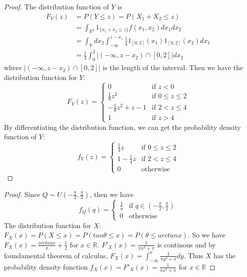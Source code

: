 \documentclass[10pt]{article}
\newenvironment{problem}[2][Problem]{\begin{trivlist}
\item[\hskip \labelsep {\bfseries #1}\hskip \labelsep {\bfseries #2.}]}{\end{trivlist}}
\begin{document}
\begin{problem}{1(b)}
\end{problem}
\begin{proof}
The distribution function of $Y$ is 
\begin{equation}
\begin{split}
F_{Y}(z) &= P(Y \le z)= P(X_{1}+X_{2} \le z)\\
&= \int_{\mathbb{R}^2} 1_{\{x_{1}+x_{2} \le z\}} f(x_{1}, x_{2})dx_{1}dx_{2}\\
&= \int_{\mathbb{R}}dx_{2}\int_{-\infty}^{z-x_{1}} \frac{1}{4} 1_{[0,2]}(x_{1}) 1_{[0,2]}(x_{2})dx_{1}\\
&= \frac{1}{4} \int_{0}^{2} \Big| (-\infty, z-x_{2}) \cap [0,2]\Big| dx_{2}
\end{split}
\end{equation}
where $\Big| (-\infty, z-x_{2}) \cap [0,2]\Big|$ is the length of the interval. Then we have the distribution function for $Y$:
\[F_{Y}(z)  = 
  \begin{cases}
  0 & \text{if $z < 0$} \\
  \frac{1}{8}z^2 & \text{if $0 \le z \le 2$} \\
  -\frac{1}{8}z^2 + z -1 & \text{if $2 < z \le 4$} \\
  1 & \text{if $z > 4$}
  \end{cases}
\]
By differentiating the distribution function, we can get the probability density function of $Y$:
\[f_{Y}(z)  = 
  \begin{cases}
  \frac{1}{4}z & \text{if $0 \le z \le 2$} \\
  1-\frac{1}{4}z & \text{if $2 < z \le 4$} \\
  0 & \text{otherwise}
  \end{cases}
\]
\end{proof}



\begin{problem}{2}
\end{problem}
 
\begin{proof}
Since $Q \sim U(-\frac{\pi}{2}, \frac{\pi}{2})$, then we have\\
\[f_{Q}(q) = 
  \begin{cases}
  \frac{1}{\pi} & \text{if $q \in (-\frac{\pi}{2}, \frac{\pi}{2})$} \\
  0 & \text{otherwise}
  \end{cases}
\]
The distribution function for $X$: $F_{X}(x) = P(X \le x) = P(tan\theta \le x) = P(\theta \le arctanx)$. So we have $F_{X}(x) =  \frac{arctanx}{\pi} + \frac{1}{2}$ for $x \in \mathbb{R}$. $F'_{X}(x) = \frac{1}{\pi x^2+\pi}$ is continous and by foundamental theorem of calculus, $F_{X}(x) = \int_{-\infty}^{x} \frac{1}{\pi y^2+\pi}dy$. Thus $X$ has the probability density function $f_{X}(x) = F'_{X}(x) = \frac{1}{\pi x^2+\pi}$ for $x \in \mathbb{R}$
\end{proof}
\end{document}
